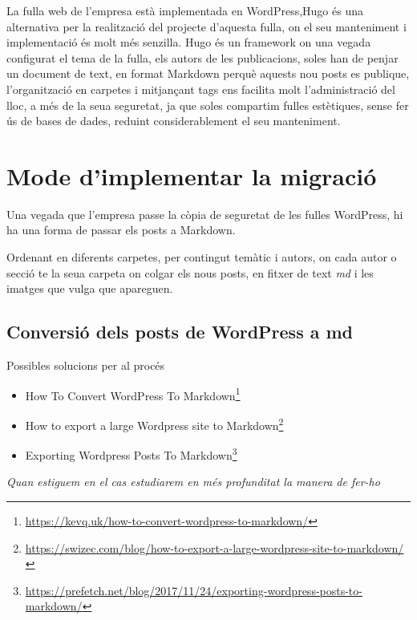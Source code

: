 \documentclass[
  10pt,
]{krantz}
\DeclareRobustCommand{\href}[2]{#2\footnote{\url{#1}}}
\providecommand{\tightlist}{%
  \setlength{\itemsep}{0pt}\setlength{\parskip}{0pt}}
\begin{document}
La fulla web de l'empresa està implementada en WordPress,Hugo és una alternativa per la realització del projecte d'aquesta fulla, on el seu manteniment i implementació és molt més senzilla. Hugo és un framework on una vegada configurat el tema de la fulla, els autors de les publicacions, soles han de penjar un document de text, en format Markdown perquè aquests nou posts es publique, l'organització en carpetes i mitjançant tags ens facilita molt l'administració del lloc, a més de la seua seguretat, ja que soles compartim fulles estètiques, sense fer ús de bases de dades, reduint considerablement el seu manteniment.

\hypertarget{mode-dimplementar-la-migraciuxf3}{%
\section{Mode d'implementar la migració}\label{mode-dimplementar-la-migraciuxf3}}

Una vegada que l'empresa passe la còpia de seguretat de les fulles WordPress, hi ha una forma de passar els posts a Markdown.

Ordenant en diferents carpetes, per contingut temàtic i autors, on cada autor o secció te la seua carpeta on colgar els nous posts, en fitxer de text \emph{md} i les imatges que vulga que apareguen.

\hypertarget{conversiuxf3-dels-posts-de-wordpress-a-md}{%
\subsection{Conversió dels posts de WordPress a md}\label{conversiuxf3-dels-posts-de-wordpress-a-md}}

Possibles solucions per al procés

\begin{itemize}
\tightlist
\item
  \href{https://kevq.uk/how-to-convert-wordpress-to-markdown/}{How To Convert WordPress To Markdown}
\item
  \href{https://swizec.com/blog/how-to-export-a-large-wordpress-site-to-markdown/}{How to export a large Wordpress site to Markdown}
\item
  \href{https://prefetch.net/blog/2017/11/24/exporting-wordpress-posts-to-markdown/}{Exporting Wordpress Posts To Markdown}
\end{itemize}

\emph{Quan estiguem en el cas estudiarem en més profunditat la manera de fer-ho}
\end{document}
